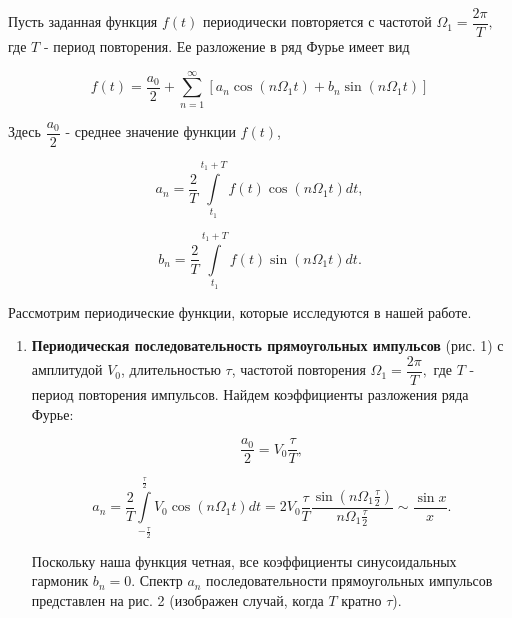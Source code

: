 \documentclass[12pt]{kiarticle}
\begin{document}
	Пусть заданная функция $f(t)$ периодически повторяется с частотой $\Omega_{1}=\dfrac{2\pi}{T},$ где $T$ - период повторения. Ее разложение в ряд Фурье имеет вид
	
	$$ f(t)=\dfrac{a_{0}}{2}+ \sum\limits_{n=1}^\infty [a_{n}\cos(n \Omega_{1}t)+b_{n}\sin(n \Omega_{1} t) ]$$
	
	Здесь $\dfrac{a_{0}}{2}$ - среднее значение функции $f(t)$,
	
	$$ a_{n}=\dfrac{2}{T}\int\limits_{t_{1}}^{t_{1}+T}f(t)\cos(n \Omega_{1} t)dt, $$
	
	$$ b_{n}=\dfrac{2}{T}\int\limits_{t_{1}}^{t_{1}+T}f(t)\sin(n \Omega_{1} t)dt. $$
	
	
	Рассмотрим периодические функции, которые исследуются в нашей
	работе.
	
	\begin{enumerate}
		
	\item 	\textbf{Периодическая последовательность прямоугольных импульсов} (рис. 1) с амплитудой $V_{0}$, длительностью $\tau$, частотой повторения $\Omega_{1}=\dfrac{2\pi}{T},$ где $T$ - период повторения импульсов. Найдем коэффициенты разложения ряда Фурье:
	
	$$\dfrac{a_{0}}{2}=V_{0}\dfrac{\tau}{T},$$
	
	$$a_{n}=\dfrac{2}{T}\int\limits_{-\frac{\tau}{2}}^{\frac{\tau}{2}}V_{0}\cos(n \Omega_{1} t)dt=2V_{0}\dfrac{\tau}{T}\dfrac{\sin(n \Omega_{1} \frac{\tau}{2})}{n\Omega_{1}\frac{\tau}{2}} \sim \dfrac{\sin x}{x}.$$
	
	Поскольку наша функция четная, все коэффициенты синусоидальных гармоник $b_{n}=0$. Спектр $a_{n}$ последовательности прямоугольных импульсов представлен на рис. 2 (изображен случай, когда $T$ кратно $\tau$).
		

\end{enumerate}
\end{document}
